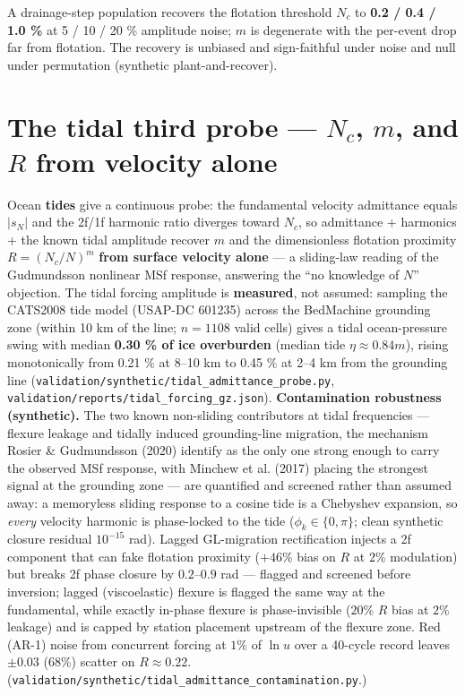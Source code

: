 \documentclass[tc, manuscript]{copernicus}
\begin{document}
A drainage-step population recovers the flotation threshold $N_{c}$ to \textbf{0.2 / 0.4 / 1.0 \%} at 5 / 10 / 20 \% amplitude noise; $m$ is degenerate with the per-event drop far from flotation. The recovery is unbiased and sign-faithful under noise and null under permutation (synthetic plant-and-recover).

\section{The tidal third probe — $N_{c}$, $m$, and $R$ from velocity alone}

Ocean \textbf{tides} give a continuous probe: the fundamental velocity admittance equals $|s_{N}|$ and the 2f/1f harmonic ratio diverges toward $N_{c}$, so admittance + harmonics + the known tidal amplitude recover $m$ and the dimensionless flotation proximity $R=(N_{c}/N)^{m}$ \textbf{from surface velocity alone} — a sliding-law reading of the Gudmundsson nonlinear MSf response, answering the ``no knowledge of $N$'' objection. The tidal forcing amplitude is \textbf{measured}, not assumed: sampling the CATS2008 tide model (USAP-DC 601235) across the BedMachine grounding zone (within 10 km of the line; $n=1108$ valid cells) gives a tidal ocean-pressure swing with median \textbf{0.30 \% of ice overburden} (median tide $\eta \approx 0.84 m$), rising monotonically from 0.21 \% at 8–10 km to 0.45 \% at 2–4 km from the grounding line (\texttt{validation/\allowbreak{}synthetic/\allowbreak{}tidal\_\allowbreak{}admittance\_\allowbreak{}probe.\allowbreak{}py}, \texttt{validation/\allowbreak{}reports/\allowbreak{}tidal\_\allowbreak{}forcing\_\allowbreak{}gz.\allowbreak{}json}). \textbf{Contamination robustness (synthetic).} The two known non-sliding contributors at tidal frequencies — flexure leakage and tidally induced grounding-line migration, the mechanism Rosier \& Gudmundsson (2020) identify as the only one strong enough to carry the observed MSf response, with Minchew et al. (2017) placing the strongest signal at the grounding zone — are quantified and screened rather than assumed away: a memoryless sliding response to a cosine tide is a Chebyshev expansion, so \emph{every} velocity harmonic is phase-locked to the tide ($\phi _{k}\in \{0,\pi \}$; clean synthetic closure residual $10^{-15}$ rad). Lagged GL-migration rectification injects a 2f component that can fake flotation proximity ($+46\%$ bias on $R$ at $2\%$ modulation) but breaks 2f phase closure by $0.2$–$0.9$ rad — flagged and screened before inversion; lagged (viscoelastic) flexure is flagged the same way at the fundamental, while exactly in-phase flexure is phase-invisible ($20\%$ $R$ bias at $2\%$ leakage) and is capped by station placement upstream of the flexure zone. Red (AR-1) noise from concurrent forcing at $1\%$ of $\ln u$ over a 40-cycle record leaves $\pm 0.03$ (68\%) scatter on $R\approx 0.22$. (\texttt{validation/\allowbreak{}synthetic/\allowbreak{}tidal\_\allowbreak{}admittance\_\allowbreak{}contamination.\allowbreak{}py}.)
\end{document}
